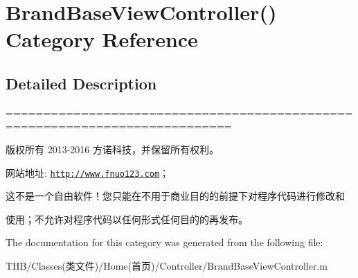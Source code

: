 \hypertarget{category_brand_base_view_controller_07_08}{}\section{Brand\+Base\+View\+Controller() Category Reference}
\label{category_brand_base_view_controller_07_08}


\subsection{Detailed Description}
============================================================================

版权所有 2013-\/2016 方诺科技，并保留所有权利。

网站地址\+: \href{http://www.fnuo123.com}{\tt http\+://www.\+fnuo123.\+com}； 



这不是一个自由软件！您只能在不用于商业目的的前提下对程序代码进行修改和

使用；不允许对程序代码以任何形式任何目的的再发布。 

 

The documentation for this category was generated from the following file\+:\begin{DoxyCompactItemize}
\item 
T\+H\+B/\+Classes(类文件)/\+Home(首页)/\+Controller/Brand\+Base\+View\+Controller.\+m\end{DoxyCompactItemize}
